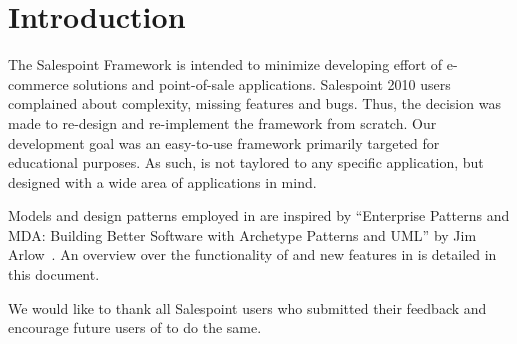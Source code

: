 \chapter{Introduction}
The Salespoint Framework is intended to minimize developing effort of e-commerce solutions and point-of-sale applications.
Salespoint 2010 users complained about complexity, missing features and bugs.
Thus, the decision was made to re-design and re-implement the framework from scratch.
Our development goal was an easy-to-use framework primarily targeted for educational purposes.
As such, \salespoint{} is not taylored to any specific application, but designed with a wide area of applications in mind.

Models and design patterns employed in \salespoint{} are inspired by ``Enterprise Patterns and MDA: Building Better Software with Archetype Patterns and UML'' by Jim Arlow~\cite{MDA}.
An overview over the functionality of and new features in \salespoint{} is detailed in this document.

We would like to thank all Salespoint users who submitted their feedback and encourage future users of \salespoint{} to do the same.

